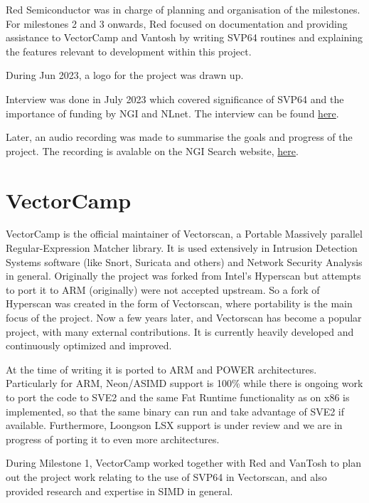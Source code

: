 Red Semiconductor was in charge of planning and organisation of the milestones.
For milestones 2 and 3 onwards, Red focused on documentation and providing
assistance to VectorCamp and Vantosh by writing SVP64 routines and explaining
the features relevant to development within this project.

During Jun 2023, a logo for the project was drawn up.

Interview was done in July 2023 which covered significance of SVP64 and
the importance of funding by NGI and NLnet.
The interview can be found
\href{https://spaces.fundingbox.com/spaces/ngi-community-ngi-innovators/64b8dadbabf7a659885ee01e}{here}.

Later, an audio recording was made to summarise the goals and progress of the
project. The recording is avalable on the NGI Search website, 
\href{https://www.ngisearch.eu/view/Events/OC1Searchers}{here}.

\section{VectorCamp}

VectorCamp is the official maintainer of Vectorscan, a Portable Massively
parallel Regular-Expression Matcher library. It is used extensively in
Intrusion Detection Systems software (like Snort, Suricata and others)
and Network Security Analysis in general. Originally the project was forked
from Intel’s Hyperscan but attempts to port it to ARM (originally) were not
accepted upstream. So a fork of Hyperscan was created in the form of
Vectorscan, where portability is the main focus of the project.
Now a few years later, and Vectorscan has become a popular project,
with many external contributions. It is currently heavily developed and
continuously optimized and improved.

At the time of writing it is ported
to ARM and POWER architectures. Particularly for ARM, Neon/ASIMD support
is 100\% while there is ongoing work to port the code to SVE2 and
the same Fat Runtime functionality as on x86 is implemented,
so that the same binary can run and take advantage of SVE2 if available.
Furthermore, Loongson LSX support is under review and we are in progress of
porting it to even more architectures.

During Milestone 1, VectorCamp worked together with Red and VanTosh to plan out
the project work relating to the use of SVP64 in Vectorscan, and also provided
research and expertise in SIMD in general.

